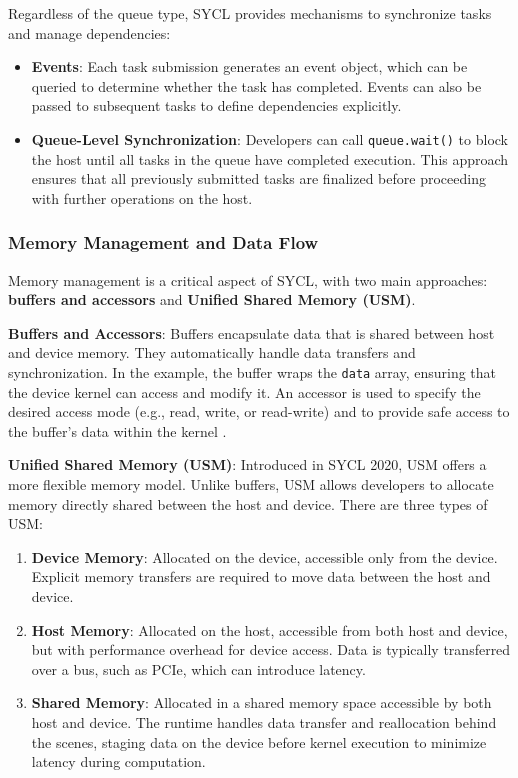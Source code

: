 Regardless of the queue type, SYCL provides mechanisms to synchronize tasks and manage dependencies:
\begin{itemize}
    \item \textbf{Events}: Each task submission generates an event object, which can be queried to determine whether the task has
    completed. Events can also be passed to subsequent tasks to define dependencies explicitly.
    \item \textbf{Queue-Level Synchronization}: Developers can call \texttt{queue.wait()} to block the host until all tasks in the
    queue have completed execution. This approach ensures that all previously submitted tasks are finalized before proceeding with
    further operations on the host.
\end{itemize}
\cite{SYCL2020}

\subsubsection{Memory Management and Data Flow}
\label{sec:sycl_memory}

Memory management is a critical aspect of SYCL, with two main approaches: \textbf{buffers and accessors} and \textbf{Unified Shared
Memory (USM)}.

\textbf{Buffers and Accessors}: Buffers encapsulate data that is shared between host and device memory. They automatically handle
data transfers and synchronization. In the example, the buffer wraps the \texttt{data} array, ensuring that the device kernel can
access and modify it. An accessor is used to specify the desired access mode (e.g., read, write, or read-write) and to provide safe
access to the buffer's data within the kernel \cite{SYCL2020}.

\textbf{Unified Shared Memory (USM)}: Introduced in SYCL 2020, USM offers a more flexible memory model. Unlike buffers, USM allows
developers to allocate memory directly shared between the host and device. There are three types of USM:
\begin{enumerate}
    \item \textbf{Device Memory}: Allocated on the device, accessible only from the device. Explicit memory transfers are required to
    move data between the host and device.
    \item \textbf{Host Memory}: Allocated on the host, accessible from both host and device, but with performance overhead for device
    access. Data is typically transferred over a bus, such as PCIe, which can introduce latency.
    \item \textbf{Shared Memory}: Allocated in a shared memory space accessible by both host and device. The runtime handles data
    transfer and reallocation behind the scenes, staging data on the device before kernel execution to minimize latency during
    computation.
\end{enumerate}

